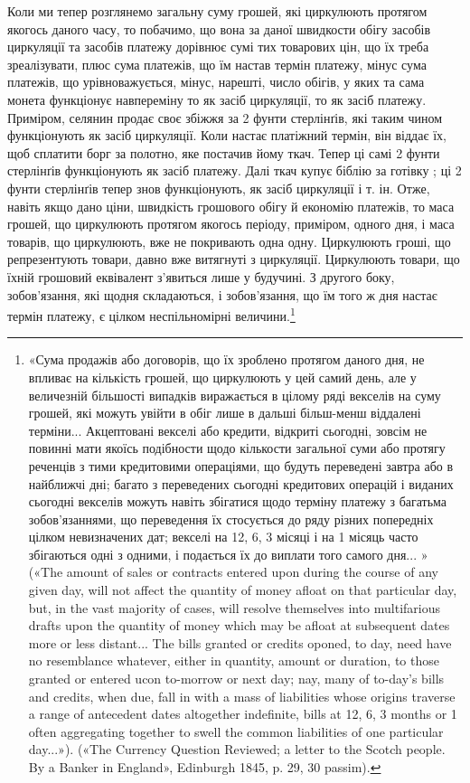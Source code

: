 Коли ми тепер розглянемо загальну суму грошей, які циркулюють протягом якогось даного часу, то
побачимо, що вона за даної швидкости обігу засобів циркуляції та засобів платежу дорівнює сумі тих
товарових цін, що їх треба зреалізувати, плюс сума платежів, що їм настав термін платежу, мінус сума
платежів, що урівноважується, мінус, нарешті, число обігів, у яких та сама монета функціонує
навпереміну то як засіб циркуляції, то як засіб платежу. Приміром, селянин продає своє збіжжя за 2
фунти стерлінґів, які таким чином функціонують як засіб циркуляції. Коли настає платіжний термін,
він віддає їх, щоб сплатити борг за полотно, яке постачив йому ткач. Тепер ці самі 2 фунти
стерлінґів функціонують як засіб платежу. Далі ткач купує біблію за готівку ; ці 2 фунти стерлінґів
тепер знов функціонують,
як засіб циркуляції і т. ін. Отже, навіть якщо дано ціни, швидкість грошового обігу й
економію платежів, то маса грошей, що циркулюють протягом якогось періоду, приміром, одного дня, і
маса товарів, що циркулюють, вже не покривають одна одну. Циркулюють гроші, що репрезентують товари,
давно вже витягнуті з циркуляції. Циркулюють товари, що їхній грошовий еквівалент з’явиться лише у
будучині. З другого боку, зобов’язання, які щодня складаються, і зобов’язання, що їм того ж дня
настає термін платежу, є цілком неспільномірні величини.\footnote{
«Сума продажів або договорів, що їх зроблено протягом даного дня, не впливає на кількість
грошей, що циркулюють у цей самий день, але у величезній більшості випадків виражається в цілому
ряді векселів на суму грошей, які можуть увійти в обіг лише в дальші більш-менш віддалені терміни...
Акцептовані векселі або кредити, відкриті сьогодні, зовсім не повинні мати якоїсь подібности щодо
кількости загальної суми або протягу реченців з тими кредитовими операціями, що будуть переведені
завтра або в найближчі дні; багато з переведених сьогодні кредитових операцій і виданих сьогодні
векселів можуть навіть збігатися щодо терміну платежу з багатьма зобов’язаннями, що переведення їх
стосується до ряду різних попередніх цілком невизначених дат; векселі на 12, 6, 3 місяці і на 1
місяць часто збігаються одні з одними, і подається їх до виплати того самого дня... » («The amount
of sales or contracts entered upon during the course of any given day, will not affect the quantity
of money afloat on that particular day, but, in the vast majority of cases, will resolve themselves
into multifarious drafts upon the quantity of money which may be afloat at subsequent dates more or
less distant... The bills granted or credits oponed, to day, need have no resemblance whatever,
either in quantity, amount or duration, to those granted or entered ucon to-morrow or next day; nay,
many of to-day’s bills and credits, when due, fall in with a mass of liabilities whose origins
traverse a range of antecedent dates altogether indefinite, bills at 12, 6, 3 months or 1 often
aggregating together to swell the common liabilities of one particular day...»). («The Currency
Question Reviewed; a letter to the Scotch people. By a Banker in England», Edinburgh 1845, p. 29, 30
passim).
}

